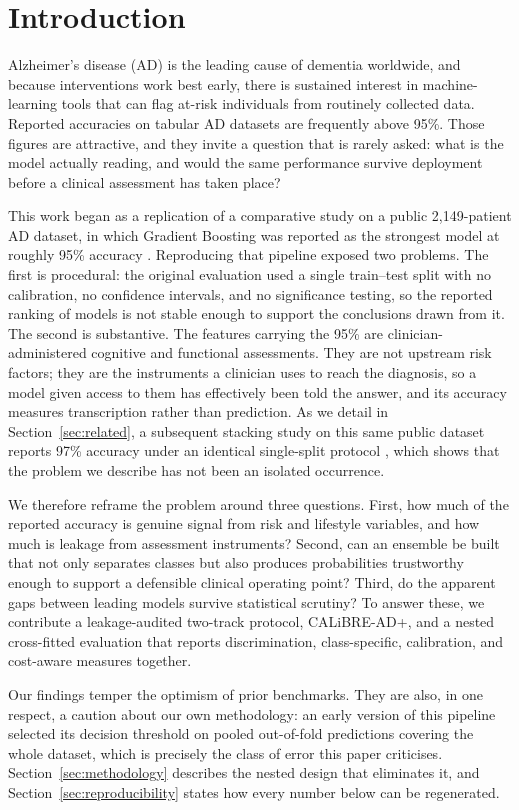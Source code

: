 \documentclass[conference]{IEEEtran}
\begin{document}
\section{Introduction}
Alzheimer's disease (AD) is the leading cause of dementia worldwide, and because interventions work best early, there is sustained interest in machine-learning tools \cite{b15} that can flag at-risk individuals from routinely collected data. Reported accuracies on tabular AD datasets are frequently above 95\%. Those figures are attractive, and they invite a question that is rarely asked: what is the model actually reading, and would the same performance survive deployment before a clinical assessment has taken place?

This work began as a replication of a comparative study on a public 2{,}149-patient AD dataset, in which Gradient Boosting was reported as the strongest model at roughly 95\% accuracy \cite{b13}. Reproducing that pipeline exposed two problems. The first is procedural: the original evaluation used a single train--test split with no calibration, no confidence intervals, and no significance testing, so the reported ranking of models is not stable enough to support the conclusions drawn from it. The second is substantive. The features carrying the 95\% are clinician-administered cognitive and functional assessments. They are not upstream risk factors; they are the instruments a clinician uses to reach the diagnosis, so a model given access to them has effectively been told the answer, and its accuracy measures transcription rather than prediction. As we detail in Section~\ref{sec:related}, a subsequent stacking study on this same public dataset reports 97\% accuracy under an identical single-split protocol \cite{b37}, which shows that the problem we describe has not been an isolated occurrence.

We therefore reframe the problem around three questions. First, how much of the reported accuracy is genuine signal from risk and lifestyle variables, and how much is leakage from assessment instruments? Second, can an ensemble be built that not only separates classes but also produces probabilities trustworthy enough to support a defensible clinical operating point? Third, do the apparent gaps between leading models survive statistical scrutiny? To answer these, we contribute a leakage-audited two-track protocol, CALiBRE-AD+, and a nested cross-fitted evaluation that reports discrimination, class-specific, calibration, and cost-aware measures together.

Our findings temper the optimism of prior benchmarks. They are also, in one respect, a caution about our own methodology: an early version of this pipeline selected its decision threshold on pooled out-of-fold predictions covering the whole dataset, which is precisely the class of error this paper criticises. Section~\ref{sec:methodology} describes the nested design that eliminates it, and Section~\ref{sec:reproducibility} states how every number below can be regenerated.
\end{document}
